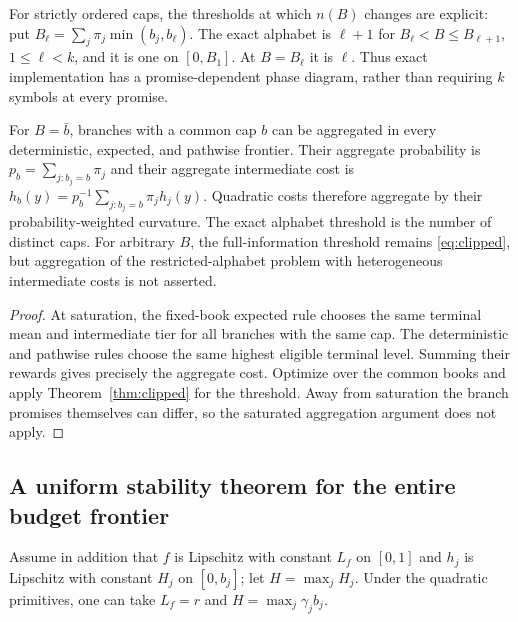 For strictly ordered caps, the thresholds at which $n(B)$ changes are explicit: put $B_\ell=\sum_j\pi_j\min(b_j,b_\ell)$. The exact alphabet is $\ell+1$ for $B_\ell<B\leq B_{\ell+1}$, $1\leq\ell<k$, and it is one on $[0,B_1]$. At $B=B_\ell$ it is $\ell$. Thus exact implementation has a promise-dependent phase diagram, rather than requiring $k$ symbols at every promise.

\begin{proposition}\label{prop:repeated}
For $B=\bar b$, branches with a common cap $b$ can be aggregated in every deterministic, expected, and pathwise frontier. Their aggregate probability is $p_b=\sum_{j:b_j=b}\pi_j$ and their aggregate intermediate cost is $h_b(y)=p_b^{-1}\sum_{j:b_j=b}\pi_jh_j(y)$. Quadratic costs therefore aggregate by their probability-weighted curvature. The exact alphabet threshold is the number of distinct caps. For arbitrary $B$, the full-information threshold remains \eqref{eq:clipped}, but aggregation of the restricted-alphabet problem with heterogeneous intermediate costs is not asserted.
\end{proposition}
\begin{proof}
At saturation, the fixed-book expected rule chooses the same terminal mean and intermediate tier for all branches with the same cap. The deterministic and pathwise rules choose the same highest eligible terminal level. Summing their rewards gives precisely the aggregate cost. Optimize over the common books and apply Theorem~\ref{thm:clipped} for the threshold. Away from saturation the branch promises themselves can differ, so the saturated aggregation argument does not apply.
\end{proof}

\subsection{A uniform stability theorem for the entire budget frontier}
Assume in addition that $f$ is Lipschitz with constant $L_f$ on $[0,1]$ and $h_j$ is Lipschitz with constant $H_j$ on $[0,b_j]$; let $H=\max_jH_j$. Under the quadratic primitives, one can take $L_f=r$ and $H=\max_j\gamma_jb_j$.

